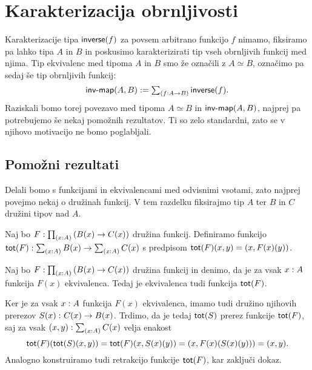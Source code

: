 \section{Karakterizacija obrnljivosti}

Karakterizacije tipa \(\textnormal{\textsf{inverse}}(f)\) za povsem arbitrano funkcijo \(f\) nimamo, fiksiramo pa lahko tipa \(A\) in \(B\) in poskusimo karakterizirati tip vseh obrnljivih funkcij med njima. Tip ekvivalenc med tipoma \(A\) in \(B\) smo že označili z \(A \simeq B\), označimo pa sedaj še tip obrnljivih funkcij:
\[\textnormal{\textsf{inv-map}}(A, B) := \textstyle \sum_{\left( f : A \to B \right)} \textnormal{\textsf{inverse}}(f).\]
Raziskali bomo torej povezavo med tipoma \(A \simeq B\) in \(\textnormal{\textsf{inv-map}}(A, B)\), najprej pa potrebujemo še nekaj pomožnih rezultatov. Ti so zelo standardni, zato se v njihovo motivacijo ne bomo poglabljali.

\subsection{Pomožni rezultati}

Delali bomo s funkcijami in ekvivalencami med odvisnimi vsotami, zato najprej povejmo nekaj o družinah funkcij. V tem razdelku fiksirajmo tip \(A\) ter \(B\) in \(C\) družini tipov nad \(A\).

\begin{definicija}
  Naj bo \(F : \textstyle \prod_{\left( x : A \right)} \left(B(x) \to C(x)\right)\) družina funkcij.
  Definiramo funkcijo
  \(\textnormal{\textsf{tot}}(F) : \textstyle \sum_{\left( x : A \right)} B(x) \to \textstyle \sum_{\left( x : A \right)} C(x)\) s predpisom
  \(\textnormal{\textsf{tot}}(F)(x, y) = (x, F(x)(y))\).
\end{definicija}

\begin{trditev}
  Naj bo \(F : \textstyle \prod_{\left( x : A \right)} \left(B(x) \to C(x)\right)\) družina funkcij
  in denimo, da je za vsak \(x : A\) funkcija \(F(x)\) ekvivalenca. Tedaj je
  ekvivalenca tudi funkcija \(\textnormal{\textsf{tot}}(F)\).
\end{trditev}

\begin{dokaz}
  Ker je za vsak \(x : A\) funkcija \(F(x)\) ekvivalenca, imamo tudi družino njihovih prerezov \(S(x) \,\colon C(x) \to B(x)\).
  Trdimo, da je tedaj \(\textnormal{\textsf{tot}}(S)\) prerez funkcije \(\textnormal{\textsf{tot}}(F)\), saj
  za vsak \((x, y) : \textstyle \sum_{\left( x : A \right)} C(x)\) velja enakost
  \[\textnormal{\textsf{tot}}(F)(\textnormal{\textsf{tot}}(S)(x, y)) = \textnormal{\textsf{tot}}(F)(x, S(x)(y)) = (x, F(x)(S(x)(y))) = (x, y).\]
  Analogno konstruiramo tudi retrakcijo funkcije \(\textnormal{\textsf{tot}}(F)\), kar zaključi dokaz.
\end{dokaz}

